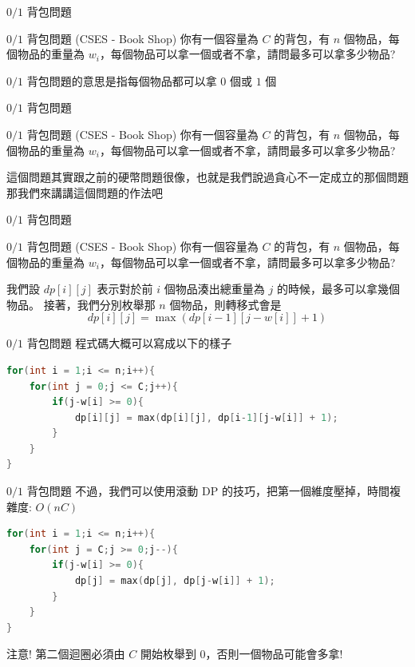 \documentclass[aspectratio=169]{beamer}
\begin{document}
\begin{frame}{$0/1$ 背包問題}
    \begin{block}{$0/1$ 背包問題 (CSES - Book Shop)}
        你有一個容量為 $C$ 的背包，有 $n$ 個物品，每個物品的重量為 $w_i$，每個物品可以拿一個或者不拿，請問最多可以拿多少物品?
    \end{block} \pause
    $0/1$ 背包問題的意思是指每個物品都可以拿 $0$ 個或 $1$ 個
\end{frame}

\begin{frame}{$0/1$ 背包問題}
    \begin{block}{$0/1$ 背包問題 (CSES - Book Shop)}
        你有一個容量為 $C$ 的背包，有 $n$ 個物品，每個物品的重量為 $w_i$，每個物品可以拿一個或者不拿，請問最多可以拿多少物品?
    \end{block} 
    這個問題其實跟之前的硬幣問題很像，也就是我們說過貪心不一定成立的那個問題 \\ \pause
    那我們來講講這個問題的作法吧
\end{frame}

\begin{frame}{$0/1$ 背包問題}
    \begin{block}{$0/1$ 背包問題 (CSES - Book Shop)}
        你有一個容量為 $C$ 的背包，有 $n$ 個物品，每個物品的重量為 $w_i$，每個物品可以拿一個或者不拿，請問最多可以拿多少物品?
    \end{block} 
    我們設 $dp[i][j]$ 表示對於前 $i$ 個物品湊出總重量為 $j$ 的時候，最多可以拿幾個物品。 \pause
    接著，我們分別枚舉那 $n$ 個物品，則轉移式會是 
    $$dp[i][j] = \max(dp[i-1][j-w[i]]+1)$$ 
\end{frame}

\begin{frame}[fragile]{$0/1$ 背包問題}
    程式碼大概可以寫成以下的樣子
    \begin{lstlisting}[language=C++]
for(int i = 1;i <= n;i++){
    for(int j = 0;j <= C;j++){
        if(j-w[i] >= 0){
            dp[i][j] = max(dp[i][j], dp[i-1][j-w[i]] + 1);
        }
    }
}
    \end{lstlisting}
\end{frame}

\begin{frame}[fragile]{$0/1$ 背包問題}
    不過，我們可以使用滾動 DP 的技巧，把第一個維度壓掉，時間複雜度: $O(nC)$
    \begin{lstlisting}[language=C++]
for(int i = 1;i <= n;i++){
    for(int j = C;j >= 0;j--){
        if(j-w[i] >= 0){
            dp[j] = max(dp[j], dp[j-w[i]] + 1);
        }
    }
}
    \end{lstlisting}
    注意! 第二個迴圈必須由 $C$ 開始枚舉到 $0$，否則一個物品可能會多拿!
\end{frame}
\end{document}
